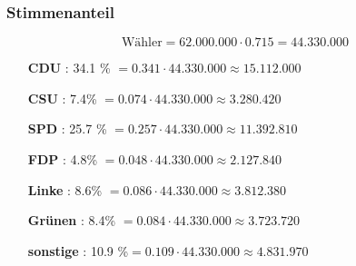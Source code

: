 \documentclass[11pt,a4paper,oneside]{article}
\begin{document}
\begin{loesung}{}
		\subsubsection*{Stimmenanteil}
		\[
		\text{Wähler} = 62.000.000 \cdot 0.715 = 44.330.000
		\]
		\begin{itemize}[leftmargin= 4cm, font=\bfseries]
			\item [\textbf{CDU}] : 34.1 \% $= 0.341 \cdot 44.330.000 \approx \boxed{15.112.000}$ 
			\item [\textbf{CSU}] : 7.4\% $= 0.074 \cdot 44.330.000 \approx \boxed{3.280.420} $ 
			\item [\textbf{SPD}] : 25.7 \% $= 0.257 \cdot 44.330.000 \approx \boxed{11.392.810}$ 
			\item [\textbf{FDP}] : 4.8\% $= 0.048 \cdot 44.330.000 \approx \boxed{2.127.840}$ 
			\item [\textbf{Linke}] : 8.6\%  $=0.086 \cdot 44.330.000 \approx \boxed{3.812.380}$ 
			\item [\textbf{Grünen}] : 8.4\% $= 0.084 \cdot 44.330.000 \approx \boxed{3.723.720}$ 
			\item [\textbf{sonstige}] : 10.9 \%$= 0.109 \cdot 44.330.000 \approx \boxed{4.831.970}$ 
		\end{itemize}		
	\end{loesung}
	
	\newpage
	
\end{document}

